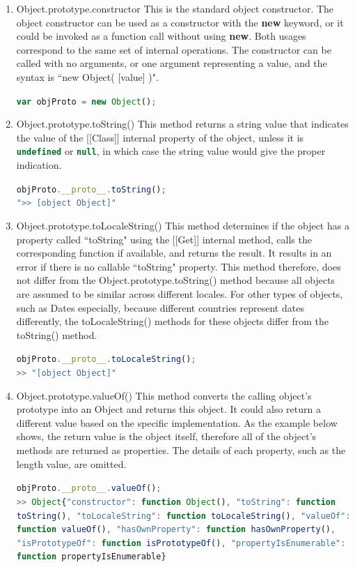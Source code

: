 \documentclass[a4paper,11pt,twoside]{report}
\def\jsinline{\lstinline[language=JavaScript, basicstyle=\small]}%\end{lstlisting}
\begin{document}
\begin{enumerate}
\item Object.prototype.constructor \newline
This is the standard object constructor. The object constructor can be used as a constructor with the \textbf{new} keyword, or it could be invoked as a function call without using \textbf{new}. Both usages correspond to the same set of internal operations. The constructor can be called with no arguments, or one argument representing a value, and the syntax is ``new Object( [value] )".

\jsinline|var objProto = new Object();|

\item Object.prototype.toString() \newline
This method returns a string value that indicates the value of the [[Class]] internal property of the object, unless it is \jsinline|undefined| or \jsinline|null|, in which case the string value would give the proper indication.

\jsinline|objProto.__proto__.toString();| \\
\jsinline|">> [object Object]"|

\item Object.prototype.toLocaleString() \newline
This method determines if the object has a property called ``toString" using the [[Get]] internal method, calls the corresponding function if available, and returns the result. It results in an error if there is no callable ``toString" property. This method therefore, does not differ from the Object.prototype.toString() method because all objects are assumed to be similar across different locales. For other types of objects, such as Dates especially, because different countries represent dates differently, the toLocaleString() methods for these objects differ from the toString() method.

\jsinline|objProto.__proto__.toLocaleString();| \\
\jsinline|>> "[object Object]"|

\item Object.prototype.valueOf() \newline
This method converts the calling object's prototype into an Object and returns this object. It could also return a different value based on the specific implementation. As the example below shows, the return value is the object itself, therefore all of the object's methods are returned as properties. The details of each property, such as the length value, are omitted.
\begin{adjustwidth}{0cm}{2.5cm}
\jsinline|objProto.__proto__.valueOf();| \\
\jsinline|>> Object{"constructor": function Object(), "toString": function toString(), "toLocaleString": function toLocaleString(), "valueOf": function valueOf(), "hasOwnProperty": function hasOwnProperty(), "isPrototypeOf": function isPrototypeOf(), "propertyIsEnumerable": function propertyIsEnumerable}|
\end{adjustwidth}


\end{enumerate}
\end{document}
